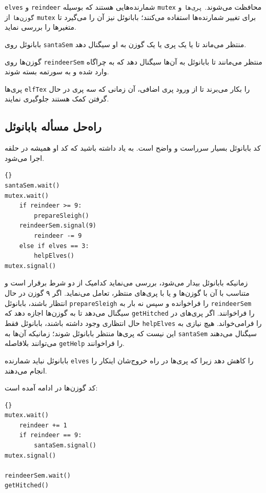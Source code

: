 \documentclass{book}
\newcommand{\clearemptydoublepage}{}%
\begin{document}
    {\tt elves} و {\tt reindeer} شمارنده‌هایی هستند که بوسیله {\tt mutex} محافظت می‌شوند. 
    {\tt پری‌ها} و {\tt گوزن‌‌ها} از {\tt mutex} برای تغییر شمارنده‌ها استفاده می‌کنند؛‌ بابانوئل نیز آن را می‌گیرد تا متغیرها را بررسی نماید.

    بابانوئل روی  {\tt santaSem} منتظر می‌ماند تا یا یک پری یا یک گوزن به او سیگنال دهد. 

    گوزن‌ها روی {\tt reindeerSem} منتظر می‌مانند تا بابانوئل به آن‌ها سیگنال دهد که به چراگاه وارد شده و به سورتمه بسته شوند. 

    پری‌ها {\tt elfTex} را بکار می‌برند تا از ورود پری اضافی، آن زمانی که سه پری در حال گرفتن کمک هستند جلوگیری نمایند. 


\clearemptydoublepage
\subsection{راه‌حل مسأله بابانوئل}

    کد بابانوئل بسیار سرراست و واضح است. به یاد داشته باشید که کد او همیشه در حلقه اجرا می‌شود. 

\begin{latin}
\begin{lstlisting}[title=\rl{راه‌حل مسأله بابانوئل (بابانوئل)}]{}
santaSem.wait()
mutex.wait()
    if reindeer >= 9:
        prepareSleigh()
	reindeerSem.signal(9)
        reindeer -= 9
    else if elves == 3:
        helpElves()
mutex.signal()
\end{lstlisting}
\end{latin}

    زمانیکه بابانوئل بیدار می‌شود، بررسی می‌نماید کدامیک از دو شرط برقرار است و متناسب با آن با گوزن‌ها  و یا با پری‌های منتظر، تعامل می‌نماید. 
    اگر ۹ گوزن در حال انتظار باشند، بابانوئل  {\tt prepareSleigh} را فراخوانده و سپس نه بار به {\tt reindeerSem} سیگنال می‌دهد تا به گوزن‌ها
    اجازه دهد که {\tt getHitched} را فراخوانند. اگر پری‌های در حال انتظاری وجود داشته باشند، بابانوئل فقط {\tt helpElves} را فرامی‌خواند. 
    هیچ نیازی به این نیست که پری‌ها منتظر بابانوئل شوند؛ زمانیکه آن‌ها به {\tt santaSem} سیگنال می‌دهند می‌توانند بلافاصله  {\tt getHelp}  را فراخوانند. 

    بابانوئل نباید شمارنده {\tt elves} را کاهش دهد زیرا که پری‌ها در راه خروج‌شان اینکار را انجام می‌دهند. 

    کد گوزن‌ها در ادامه آمده است: 

\begin{latin}
\begin{lstlisting}[title=\rl{راه‌حل مسأله بابانوئل (گوزن‌ها)}]{}
mutex.wait()
    reindeer += 1
    if reindeer == 9:
        santaSem.signal()
mutex.signal()

reindeerSem.wait()
getHitched()
\end{lstlisting}
\end{latin}
\end{document}
